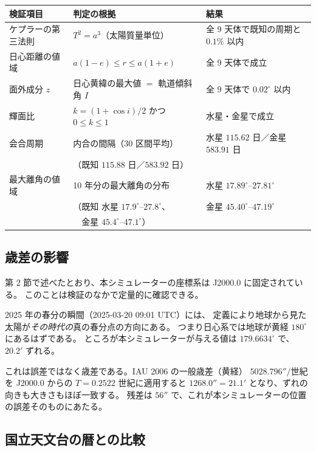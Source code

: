 \documentclass[a4paper,11pt]{ltjsarticle}
\begin{document}
\begin{center}
\begin{tabular}{lll}
  \toprule
  検証項目 & 判定の根拠 & 結果\\
  \midrule
  ケプラーの第三法則 & $T^2 = a^3$（太陽質量単位） & 全 9 天体で既知の周期と $0.1\%$ 以内\\
  日心距離の値域 & $a(1-e) \le r \le a(1+e)$ & 全 9 天体で成立\\
  面外成分 $z$ & 日心黄緯の最大値 $=$ 軌道傾斜角 $I$ & 全 9 天体で $0.02^\circ$ 以内\\
  輝面比 & $k = (1+\cos i)/2$ かつ $0\le k\le 1$ & 水星・金星で成立\\
  会合周期 & 内合の間隔（30 区間平均） & 水星 $115.62$ 日／金星 $583.91$ 日\\
   & （既知 $115.88$ 日／$583.92$ 日） & \\
  最大離角の値域 & 10 年分の最大離角の分布 & 水星 $17.89^\circ$--$27.81^\circ$\\
   & （既知 水星 $17.9^\circ$--$27.8^\circ$、 & 金星 $45.40^\circ$--$47.19^\circ$\\
   & 　金星 $45.4^\circ$--$47.1^\circ$） & \\
  \bottomrule
\end{tabular}
\end{center}

\subsection{歳差の影響}

第 2 節で述べたとおり、本シミュレーターの座標系は J2000.0 に固定されている。
このことは検証のなかで定量的に確認できる。

2025 年の春分の瞬間（2025-03-20 09:01 UTC）には、
定義により地球から見た太陽が\emph{その時代の}真の春分点の方向にある。
つまり日心系では地球が黄経 $180^\circ$ にあるはずである。
ところが本シミュレーターが与える値は $179.6634^\circ$ で、$20.2'$ ずれる。

これは誤差ではなく歳差である。IAU 2006 の一般歳差（黄経）
$5028.796''/\text{世紀}$ を J2000.0 からの $T=0.2522$ 世紀に適用すると
$1268.0'' = 21.1'$ となり、ずれの向きも大きさもほぼ一致する。
残差は $56''$ で、これが本シミュレーターの位置の誤差そのものにあたる。

\subsection{国立天文台の暦との比較}
\end{document}
